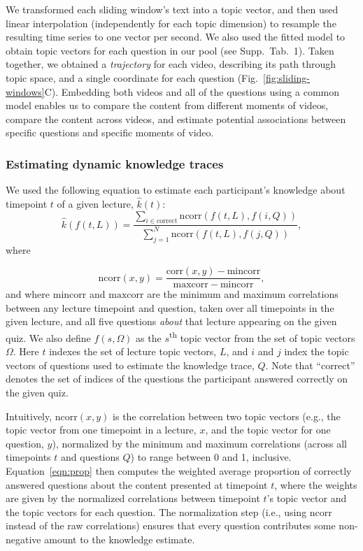 \documentclass[10pt]{article}
\newcommand{\questions}{1}
\begin{document}
We transformed each sliding window's text into a topic vector, and then used
linear interpolation (independently for each topic dimension) to resample the
resulting time series to one vector per second. We also used the fitted model to
obtain topic vectors for each question in our pool (see Supp.~Tab.~\questions).
Taken together, we obtained a \textit{trajectory} for each video, describing
its path through topic space, and a single coordinate for each question
(Fig.~\ref{fig:sliding-windows}C). Embedding both videos and all of the
questions using a common model enables us to compare the content from different
moments of videos, compare the content across videos, and estimate potential
associations between specific questions and specific moments of video.


\subsubsection*{Estimating dynamic knowledge traces}\label{subsec:traces}

We used the following equation to estimate each participant's knowledge about
timepoint $t$ of a given lecture, $\hat{k}(t)$:
\begin{equation}
    \hat{k}\left(f(t, L)\right) = \frac{\sum_{i \in \mathrm{correct}}\mathrm{ncorr}\left(f(t, L), f(i, Q)\right)}{\sum_{j = 1}^N \mathrm{ncorr}\left(f(t, L), f(j, Q)\right)},
    \label{eqn:prop}
\end{equation}
where

\begin{equation}
    \mathrm{ncorr}(x, y) = \frac{\mathrm{corr}(x, y) - \mathrm{mincorr}}{\mathrm{maxcorr} - \mathrm{mincorr}},
\end{equation}
and where $\mathrm{mincorr}$ and $\mathrm{maxcorr}$ are the minimum and maximum
correlations between any lecture timepoint and question, taken over all
timepoints in the given lecture, and all five questions \textit{about} that lecture appearing on the given quiz.
We also define $f(s, \Omega)$ as the
$s$\textsuperscript{th} topic vector from the set of topic vectors $\Omega$.
Here $t$ indexes the set of lecture topic vectors, $L$, and $i$ and $j$ index
the topic vectors of questions used to estimate the knowledge trace, $Q$. Note
that ``correct'' denotes the set of indices of the questions the participant
answered correctly on the given quiz.

Intuitively, $\mathrm{ncorr}(x, y)$ is the correlation between two topic
vectors (e.g., the topic vector from one timepoint in a lecture, $x$, and the
topic vector for one question, $y$), normalized by the minimum and maximum
correlations (across all timepoints $t$ and questions $Q$) to range between 0
and 1, inclusive. Equation~\ref{eqn:prop} then computes the weighted average
proportion of correctly answered questions about the content presented at
timepoint $t$, where the weights are given by the normalized correlations
between timepoint $t$'s topic vector and the topic vectors for each question.
The normalization step (i.e., using $\mathrm{ncorr}$ instead of the raw
correlations) ensures that every question contributes some non-negative amount
to the knowledge estimate.
\end{document}
